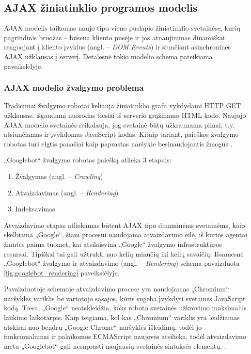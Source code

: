 \subsection{AJAX žiniatinklio programos modelis}

AJAX modelis taikomas naujo tipo vieno puslapio žiniatinklio svetainėse, kurių pagrindinis bruožas -- būsena kliento pusėje ir jos atnaujinimas dinamiškai reaguojant į kliento įvykius (angl. -- \textit{DOM Events}) ir siunčiant asinchronines AJAX užklausas į serverį. Detalesnė tokio modelio schema pateikiama  paveikslėlyje.

\subsubsection{AJAX modelio žvalgymo problema}

Tradiciniai žvalgymo robotai keliauja žiniatinklio grafu vykdydami HTTP GET užklausas, išgaudami nuorodas tiesiai iš serverio grąžinamo HTML kodo. Naujojo AJAX modelio svetainės reikalauja, jog svetainė būtų užkraunama pilnai, t.y. atsiunčiamas ir įvykdomas JavaScript kodas. Kitaip tariant, paieškos žvalgymo robotas turi elgtis panašiai kaip paprastas naršykle besinaudojantis žmogus \cite{JavaScriptCrawl}.


„Googlebot“ žvalgymo robotas paiešką atlieka 3 etapais:
\pagebreak

\begin{enumerate}
    \item Žvalgymas (angl. -- \textit{Crawling})
    \item Atvaizdavimas (angl. -- \textit{Rendering})
    \item Indeksavimas
\end{enumerate}

Atvaizdavimo etapas atliekamas būtent AJAX tipo dinaminėms svetainėms, kaip skelbiama „Google“, šiam procesui naudojama atvaizdavimo eilė, iš kurios agentai žinutes paima tuomet, kai atsilaisvina „Google“ žvalgymo infrastruktūros resursai. Tipiškai tai gali užtrukti nuo kelių minučių iki kelių savaičių. Išsamesnė „Googlebot“ žvalgymo ir atvaizdavimo (angl. -- \textit{Rendering}) schema pavaizduota \ref{fig:googlebot_rendering} paveikslėlyje.



Pavaizduotoje schemoje atvaizdavimo procese yra naudojamas „Chromium“ naršyklės variklis be vartotojo sąsajos, kuris sugeba įvykdyti svetainės JavaScript kodą. Tiesa, „Google“ neatskleidžia, koks roboto svetainės užkrovimo maksimalus laukimo laikotarpis. Kaip teigiama, kol kas „Chromium“ variklis yra leidžiamas atskirai nuo bendrų „Google Chrome“ naršyklės išleidimų, todėl jo funkcionalumai ir palaikomos ECMAScript naujovės atsilieka, todėl atvaizdavimo metu „Googlebot“ gali nesuprasti naujausių svetainės sintaksės elementų. \cite{GooglebotCrawling}.
